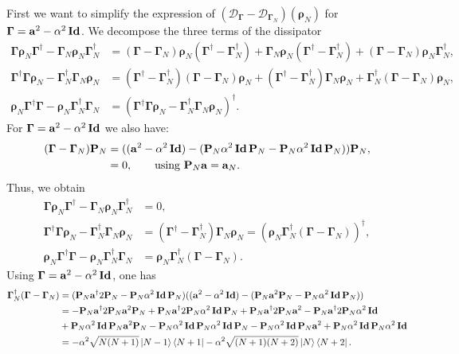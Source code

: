 \documentclass[a4paper,onecolumn,amsmath,amssymb,amsfonts,accepted=2026-03-06]{quantumarticle}
\newcommand{\Id}{\operatorname{\mathbf{Id}}}
\newcommand{\cD}{\mathcal D}
\newcommand{\LL}{{\mathbf{\Gamma}}}
\newcommand{\Proj}[1]{\mathbf{P}_{#1}}
\newcommand{\destroy}{{\bf a}}
\newcommand{\create}{{\bf a^\dag}}
\begin{document}
\label{eq:cat}
First we want to simplify the expression of $(\cD_\LL-\cD_{\LL_N})(\boldsymbol{\rho}_N)$ for $\LL = \destroy^2- \alpha^2 \Id$. We decompose the three terms of the dissipator
\begin{align}
    \LL \boldsymbol{\rho}_N \LL^\dag-\LL_N \boldsymbol{\rho}_N \LL_N^\dag&=
    (\LL-\LL_N)\boldsymbol{\rho}_N(\LL^\dag-\LL_N^\dag)+ \LL_N\boldsymbol{\rho}_N(\LL^\dag-\LL_N^\dag)+(\LL-\LL_N)\boldsymbol{\rho}_N\LL_N^\dag,\\
    \LL^\dag \LL \boldsymbol{\rho}_N- \LL_N^\dag \LL_N \boldsymbol{\rho}_N&=
    (\LL^\dag-\LL_N^\dag) (\LL-\LL_N)\boldsymbol{\rho}_N+ (\LL^\dag-\LL_N^\dag) \LL_N\boldsymbol{\rho}_N+\LL_N^\dag (\LL-\LL_N)\boldsymbol{\rho}_N,\\
    \boldsymbol{\rho}_N \LL^\dag \LL-\boldsymbol{\rho}_N  \LL_N^\dag \LL_N &=(\LL^\dag \LL \boldsymbol{\rho}_N- \LL_N^\dag \LL_N \boldsymbol{\rho}_N)^\dagger .
\end{align}
For $\LL = \destroy^2- \alpha^2 \Id$ we also have:
\begin{align}
    \notag (\LL-\LL_N)\Proj{N}&=((\destroy^2-\alpha^2\Id)-(\Proj{N}\alpha^2\Id\Proj{N}-\Proj{N}\alpha^2\Id\Proj{N}))\Proj{N},\\
    &=0, \qquad \text{using } \Proj{N} \destroy=\destroy_N.
\end{align}
Thus, we obtain
\begin{align}
    \LL \boldsymbol{\rho}_N \LL^\dag-\LL_N \boldsymbol{\rho}_N \LL_N^\dag&=0,\\
    \LL^\dag \LL \boldsymbol{\rho}_N- \LL_N^\dag \LL_N \boldsymbol{\rho}_N&=(\LL^\dag-\LL_N^\dag) \LL_N\boldsymbol{\rho}_N=(\boldsymbol{\rho}_N \LL_N^\dag (\LL-\LL_N))^\dagger,\\
    \boldsymbol{\rho}_N \LL^\dag \LL-\boldsymbol{\rho}_N  \LL_N^\dag \LL_N &=\boldsymbol{\rho}_N \LL_N^\dag (\LL-\LL_N).
\end{align}
Using $\LL = \destroy^2- \alpha^2 \Id$, one has
\begin{align}
    \notag \LL_N^\dag (\LL-\LL_N)&=(\Proj{N} \create2\Proj{N} - \Proj{N}\alpha^2\Id\Proj{N})((\destroy^2 - \alpha^2\Id) - (\Proj{N} \destroy^2\Proj{N} - \Proj{N}\alpha^2\Id\Proj{N}))\\
    \notag &=-\Proj{N} \create2 \Proj{N} \destroy^2 \Proj{N} + \Proj{N} \create2 \Proj{N} \alpha^2\Id \Proj{N} + \Proj{N} \create2 \Proj{N} \destroy^2 - \Proj{N} \create2 \Proj{N} \alpha^2\Id\\
    \notag & +  \Proj{N}\alpha^2\Id\Proj{N} \destroy^2\Proj{N} - \Proj{N}\alpha^2\Id\Proj{N}\alpha^2\Id\Proj{N} - \Proj{N}\alpha^2\Id\Proj{N} \destroy^2 + \Proj{N}\alpha^2\Id\Proj{N}\alpha^2\Id\\
    &=-\alpha^2 \sqrt{N(N+1)}\ket{N-1}\bra{N+1}-\alpha^2 \sqrt{(N+1)(N+2)}\ket{N}\bra{N+2}.
\end{align}
\end{document}
